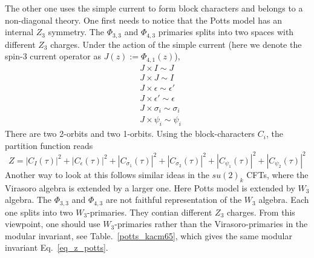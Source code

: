 The other one uses the simple current to form block characters and belongs to a non-diagonal theory. One first needs to notice that the Potts model has an internal $Z_3$ symmetry. The $\Phi_{3,3}$ and $\Phi_{4,3}$ primaries splits into two spaces with different $Z_3$ charges. Under the action of the simple current (here we denote the spin-3 current operator as $J(z) := \Phi_{4,1}(z)$),
\begin{equation}
	\begin{aligned}
		& J \times I \sim J\\
		& J \times J \sim I\\
		& J \times \epsilon \sim \epsilon'\\
		& J \times \epsilon' \sim \epsilon\\
		& J \times \sigma_i \sim \sigma_i\\
		& J \times \psi_i \sim \psi_i
	\end{aligned}
\end{equation}
There are two 2-orbits and two 1-orbits. Using the block-characters $C_i$, the partition function reads
\begin{equation}
	\label{eq_z_potts}
	Z = \vert C_I(\tau) \vert^2 + \left\vert C_\epsilon(\tau) \right\vert^2 + \left\vert C_{\sigma_1}(\tau) \right\vert^2 + \left\vert C_{\sigma_2}(\tau) \right\vert^2 + \left\vert C_{\psi_1}(\tau) \right\vert^2 + \left\vert C_{\psi_2}(\tau) \right\vert^2
\end{equation}
Another way to look at this follows similar ideas in the $su(2)_k$ CFTs, where the Virasoro algebra is extended by a larger one. Here Potts model is extended by $W_3$ algebra. The $\Phi_{3,3}$ and $\Phi_{4,3}$ are not faithful representation of the $W_3$ algebra. Each one splits into two $W_3$-primaries. They contian different $Z_3$ charges.  From this viewpoint, one should use $W_3$-primaries rather than the Virasoro-primaries in the modular invariant, see Table.~\ref{potts_kacm65}, which gives the same modular invariant Eq.~\ref{eq_z_potts}.